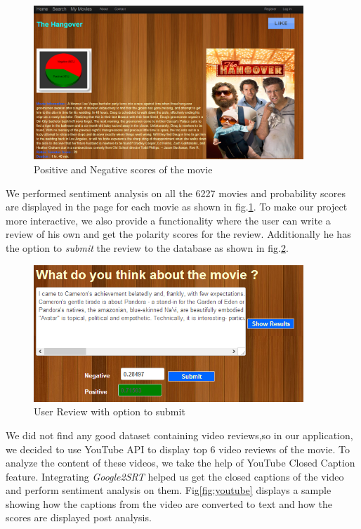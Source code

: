 \begin{figure}[H]
    \centering
    \includegraphics[width=4.0in]{score.png}
    \caption{Positive and Negative scores of the movie}
    \label{fig:score}
\end{figure}
We performed sentiment analysis on all the 6227 movies and probability scores are displayed in the page for each movie as shown in fig.\ref{fig:score}. To make our project more interactive, we also provide a functionality where the user can write a review of his own and get the polarity scores for the review. Additionally he has the option to \textit{submit} the review to the database as shown in fig.\ref{fig:review}.

\begin{figure}[H]
    \centering
    \includegraphics[width=4.0in]{review.png}
    \caption{User Review with option to submit}
    \label{fig:review}
    \end{figure}

We did not find any good dataset containing video reviews,so in our application, we decided to use YouTube API to display top 6 video reviews of the movie. To analyze the content of these videos, we take the help of YouTube Closed Caption feature. Integrating \textit{Google2SRT} \cite{youtube} helped us get the closed captions of the video and perform sentiment analysis on them. Fig\ref{fig:youtube} displays a sample showing how the captions from the video are converted to text and how the scores are displayed post analysis.


